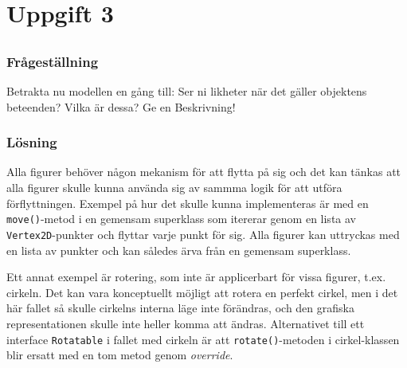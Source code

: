 %
%

\renewcommand{\thesubsection}{(\alph{subsection})}

\section{Uppgift 3}\label{sec:uppg3}

\subsection{}\label{sec:uppg3a}
\subsubsection*{Frågeställning}
Betrakta nu modellen en gång till: Ser ni likheter när det gäller objektens
beteenden? Vilka är dessa? Ge en Beskrivning!

\subsubsection*{Lösning}
Alla figurer behöver någon mekanism för att flytta på sig och det kan tänkas
att alla figurer skulle kunna använda sig av sammma logik för att utföra
förflyttningen. Exempel på hur det skulle kunna implementeras är med en
\texttt{move()}-metod i en gemensam superklass som itererar genom en lista av
\texttt{Vertex2D}-punkter och flyttar varje punkt för sig. Alla figurer kan
uttryckas med en lista av punkter och kan således ärva från en gemensam
superklass.
\par Ett annat exempel är rotering, som inte är applicerbart för vissa figurer,
t.ex. cirkeln. Det kan vara konceptuellt möjligt att rotera en perfekt cirkel,
men i det här fallet så skulle cirkelns interna läge inte förändras, och
den grafiska representationen skulle inte heller komma att ändras.
Alternativet till ett interface \texttt{Rotatable} i fallet med cirkeln är att
\texttt{rotate()}-metoden i cirkel-klassen blir ersatt med en tom metod genom
\emph{override}.


